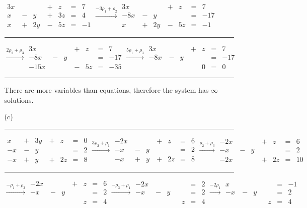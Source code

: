 \documentclass{article}
\begin{document}
\begin{enumerate}
\begin{enumerate}
$\begin{aligned}
3x&&&\ +&z&=&7\\
x&\ -&y&\ +&3z&=&4\\
x&\ +&2y&\ -&5z&=&-1
\end{aligned}
\overset{-3\rho_1+\rho_2}{\longrightarrow}
\begin{aligned}
3x&&&\ +&z&=&7\\
-8x&\ -&y&&&=&-17\\
x&\ +&2y&\ -&5z&=&-1
\end{aligned}$

\hrule

$\overset{2\rho_2+\rho_3}{\longrightarrow}
\begin{aligned}
3x&&&\ +&z&=&7\\
-8x&\ -&y&&&=&-17\\
-15x&&&\ -&5z&=&-35
\end{aligned}
\overset{5\rho_1+\rho_3}{\longrightarrow}
\begin{aligned}
3x&&&\ +&z&=&7\\
-8x&\ -&y&&&=&-17\\
&&&&0&=&0
\end{aligned}$

\hrule

There are more variables than equations, therefore the system has $\infty$ solutions.

\item[(c)]

\hrule

$\begin{aligned}
x&\ +&3y&\ +&z&=&0\\
-x&\ -&y&&&=&2\\
-x&\ +&y&\ +&2z&=&8
\end{aligned}
\overset{3\rho_2+\rho_1}{\longrightarrow}
\begin{aligned}
-2x&&&\ +&z&=&6\\
-x&\ -&y&&&=&2\\
-x&\ +&y&\ +&2z&=&8
\end{aligned}
\overset{\rho_2+\rho_3}{\longrightarrow}
\begin{aligned}
-2x&&&\ +&z&=&6\\
-x&\ -&y&&&=&2\\
-2x&&&\ +&2z&=&10
\end{aligned}$

\hrule

$\overset{-\rho_1+\rho_3}{\longrightarrow}
\begin{aligned}
-2x&&&\ +&z&=&6\\
-x&\ -&y&&&=&2\\
&&&&z&=&4
\end{aligned}
\overset{-\rho_3+\rho_1}{\longrightarrow}
\begin{aligned}
-2x&&&&&=&2\\
-x&\ -&y&&&=&2\\
&&&&z&=&4
\end{aligned}
\overset{-2\rho_1}{\longrightarrow}
\begin{aligned}
x&&&&&=&-1\\
-x&\ -&y&&&=&2\\
&&&&z&=&4
\end{aligned}$


\end{enumerate}
\end{enumerate}
\end{document}
